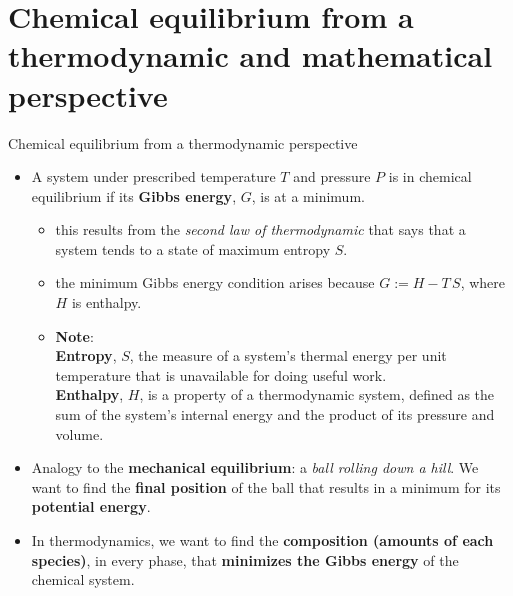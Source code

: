 
\section{Chemical equilibrium from a thermodynamic and mathematical perspective}


\begin{frame}[<+->]{Chemical equilibrium from a thermodynamic perspective}
\begin{itemize}
\item A system under prescribed temperature $T$ and pressure $P$ is in
chemical equilibrium if its \textbf{Gibbs energy}, $G$, is at a minimum. 
\begin{itemize}
\item this results from the \emph{second law of thermodynamic} that says
that a system tends to a state of maximum entropy $S$. 
\item the minimum Gibbs energy condition arises because $G := H - T\,S$, where
$H$ is enthalpy. 
\item \textbf{Note}: \\
\alert{\textbf{Entropy}}, $S$, the measure of a system's thermal energy per unit temperature that is unavailable for doing useful work. \\ 
\alert{\textbf{Enthalpy}}, $H$, is a property of a thermodynamic system, defined as the sum of the system's internal energy and the product of its pressure and volume.
\end{itemize}
\item Analogy to the \textbf{mechanical equilibrium}: a \emph{ball rolling down a hill}. 
We want to find the \textbf{final position} of the ball that results in a minimum for its 
\textbf{potential energy}.
\item In thermodynamics, we want to find the \textbf{composition (amounts of each species)}, in every phase, that \textbf{minimizes the Gibbs energy} of the chemical system.
\end{itemize}
\end{frame}
%
